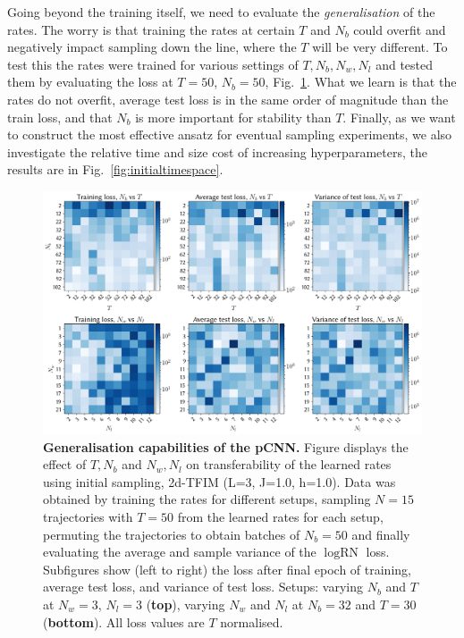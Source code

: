 Going beyond the training itself, we need to evaluate the \emph{generalisation} of the rates. The worry is that training the rates at certain $T$ and $N_b$ could overfit and negatively impact sampling down the line, where the $T$ will be very different. To test this the rates were trained for various settings of $T, N_b, N_w, N_l$ and tested them by evaluating the loss at $T=50$, $N_b=50$, Fig.~\ref{fig:avgvarloss}. What we learn is that the rates do not overfit, average test loss is in the same order of magnitude than the train loss, and that $N_b$ is more important for stability than $T$. Finally, as we want to construct the most effective ansatz for eventual sampling experiments, we also investigate the relative time and size cost of increasing hyperparameters, the results are in Fig.~\ref{fig:initialtimespace}.

\begin{figure}[H]
	\centering
	\includegraphics[width=\linewidth]{Chapter5/Figs/Raster/avg_var_loss}
	\caption[Generalisation capabilities of the pCNN]{\textbf{Generalisation capabilities of the pCNN.} Figure displays the effect of $T, N_b$ and $N_w, N_l$ on transferability of the learned rates using initial sampling, 2d-TFIM (L=3, J=1.0, h=1.0). Data was obtained by training the rates for different setups, sampling $N=15$ trajectories with $T=50$ from the learned rates for each setup, permuting the trajectories to obtain batches of $N_b=50$ and finally evaluating the average and sample variance of the $\log \text{RN}$ loss. Subfigures show (left to right) the loss after final epoch of training, average test loss, and variance of test loss. Setups: varying $N_b$ and $T$ at $N_w=3$, $N_l=3$ (\textbf{top}), varying $N_w$ and $N_l$ at $N_b=32$ and $T=30$ (\textbf{bottom}). All loss values are $T$ normalised.}
	\label{fig:avgvarloss}
\end{figure}

